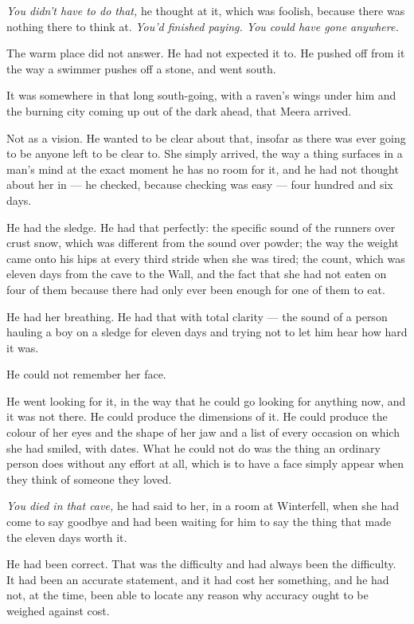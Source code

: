 \textit{You didn’t have to do that,} he thought at it, which was foolish, because there was nothing there to think at. \textit{You’d finished paying. You could have gone anywhere.}

The warm place did not answer. He had not expected it to. He pushed off from it the way a swimmer pushes off a stone, and went south.

\sceneBreak

It was somewhere in that long south-going, with a raven’s wings under him and the burning city coming up out of the dark ahead, that Meera arrived.

Not as a vision. He wanted to be clear about that, insofar as there was ever going to be anyone left to be clear to. She simply arrived, the way a thing surfaces in a man’s mind at the exact moment he has no room for it, and he had not thought about her in — he checked, because checking was easy — four hundred and six days.

He had the sledge. He had that perfectly: the specific sound of the runners over crust snow, which was different from the sound over powder; the way the weight came onto his hips at every third stride when she was tired; the count, which was eleven days from the cave to the Wall, and the fact that she had not eaten on four of them because there had only ever been enough for one of them to eat.

He had her breathing. He had that with total clarity — the sound of a person hauling a boy on a sledge for eleven days and trying not to let him hear how hard it was.

He could not remember her face.

He went looking for it, in the way that he could go looking for anything now, and it was not there. He could produce the dimensions of it. He could produce the colour of her eyes and the shape of her jaw and a list of every occasion on which she had smiled, with dates. What he could not do was the thing an ordinary person does without any effort at all, which is to have a face simply appear when they think of someone they loved.

\textit{You died in that cave,} he had said to her, in a room at Winterfell, when she had come to say goodbye and had been waiting for him to say the thing that made the eleven days worth it.

He had been correct. That was the difficulty and had always been the difficulty. It had been an accurate statement, and it had cost her something, and he had not, at the time, been able to locate any reason why accuracy ought to be weighed against cost.

